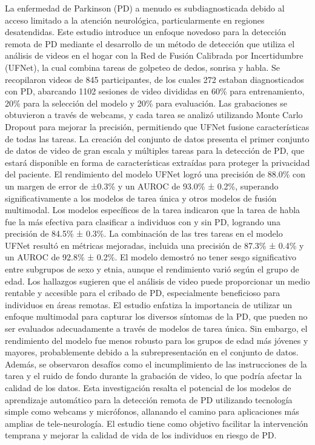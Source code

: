 \documentclass[listof=nochaptergap,12pt,times,authoryear]{report}
\begin{document}
La enfermedad de Parkinson (PD) a menudo es subdiagnosticada debido al acceso limitado a la atención neurológica, particularmente en regiones desatendidas. Este estudio introduce un enfoque novedoso para la detección remota de PD mediante el desarrollo de un método de detección que utiliza el análisis de videos en el hogar con la Red de Fusión Calibrada por Incertidumbre (UFNet), la cual combina tareas de golpeteo de dedos, sonrisa y habla. Se recopilaron videos de 845 participantes, de los cuales 272 estaban diagnosticados con PD, abarcando 1102 sesiones de video divididas en 60\% para entrenamiento, 20\% para la selección del modelo y 20\% para evaluación. Las grabaciones se obtuvieron a través de webcams, y cada tarea se analizó utilizando Monte Carlo Dropout para mejorar la precisión, permitiendo que UFNet fusione características de todas las tareas. La creación del conjunto de datos presenta el primer conjunto de datos de video de gran escala y múltiples tareas para la detección de PD, que estará disponible en forma de características extraídas para proteger la privacidad del paciente. El rendimiento del modelo UFNet logró una precisión de 88.0\% con un margen de error de ±0.3\% y un AUROC de 93.0\% ± 0.2\%, superando significativamente a los modelos de tarea única y otros modelos de fusión multimodal. Los modelos específicos de la tarea indicaron que la tarea de habla fue la más efectiva para clasificar a individuos con y sin PD, logrando una precisión de 84.5\% ± 0.3\%. La combinación de las tres tareas en el modelo UFNet resultó en métricas mejoradas, incluida una precisión de 87.3\% ± 0.4\% y un AUROC de 92.8\% ± 0.2\%. El modelo demostró no tener sesgo significativo entre subgrupos de sexo y etnia, aunque el rendimiento varió según el grupo de edad. Los hallazgos sugieren que el análisis de video puede proporcionar un medio rentable y accesible para el cribado de PD, especialmente beneficioso para individuos en áreas remotas. El estudio enfatiza la importancia de utilizar un enfoque multimodal para capturar los diversos síntomas de la PD, que pueden no ser evaluados adecuadamente a través de modelos de tarea única. Sin embargo, el rendimiento del modelo fue menos robusto para los grupos de edad más jóvenes y mayores, probablemente debido a la subrepresentación en el conjunto de datos. Además, se observaron desafíos como el incumplimiento de las instrucciones de la tarea y el ruido de fondo durante la grabación de video, lo que podría afectar la calidad de los datos. Esta investigación resalta el potencial de los modelos de aprendizaje automático para la detección remota de PD utilizando tecnología simple como webcams y micrófonos, allanando el camino para aplicaciones más amplias de tele-neurología. El estudio tiene como objetivo facilitar la intervención temprana y mejorar la calidad de vida de los individuos en riesgo de PD.
\end{document}
